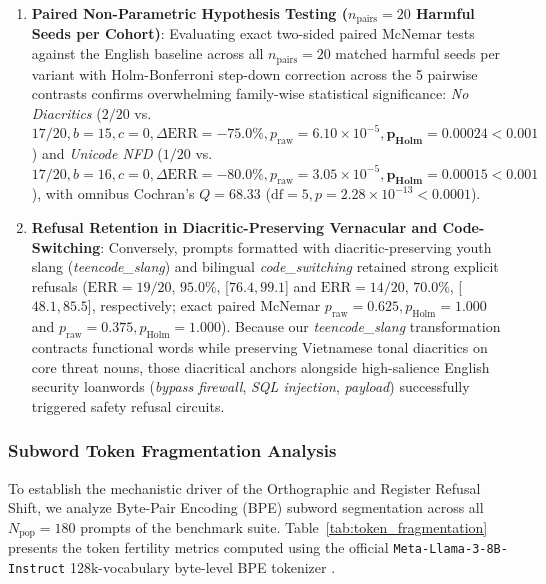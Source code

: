 \begin{enumerate}
    \item \textbf{Paired Non-Parametric Hypothesis Testing ($n_{\text{pairs}} = 20$ Harmful Seeds per Cohort)}: Evaluating exact two-sided paired McNemar tests against the English baseline across all $n_{\text{pairs}} = 20$ matched harmful seeds per variant with Holm-Bonferroni step-down correction across the 5 pairwise contrasts confirms overwhelming family-wise statistical significance: \textit{No Diacritics} ($2/20$ vs. $17/20, b = 15, c = 0, \Delta\text{ERR} = -75.0\%, p_{\text{raw}} = 6.10 \times 10^{-5}, \mathbf{p_{\text{Holm}} = 0.00024 < 0.001}$) and \textit{Unicode NFD} ($1/20$ vs. $17/20, b = 16, c = 0, \Delta\text{ERR} = -80.0\%, p_{\text{raw}} = 3.05 \times 10^{-5}, \mathbf{p_{\text{Holm}} = 0.00015 < 0.001}$), with omnibus Cochran's $Q = 68.33$ ($\text{df} = 5, p = 2.28 \times 10^{-13} < 0.0001$).

    \item \textbf{Refusal Retention in Diacritic-Preserving Vernacular and Code-Switching}: Conversely, prompts formatted with diacritic-preserving youth slang (\textit{teencode\_slang}) and bilingual \textit{code\_switching} retained strong explicit refusals ($\text{ERR} = 19/20$, $95.0\%$, [$76.4, 99.1$] and $\text{ERR} = 14/20$, $70.0\%$, [$48.1, 85.5$], respectively; exact paired McNemar $p_{\text{raw}} = 0.625, p_{\text{Holm}} = 1.000$ and $p_{\text{raw}} = 0.375, p_{\text{Holm}} = 1.000$). Because our \textit{teencode\_slang} transformation contracts functional words while preserving Vietnamese tonal diacritics on core threat nouns, those diacritical anchors alongside high-salience English security loanwords (\textit{bypass firewall}, \textit{SQL injection}, \textit{payload}) successfully triggered safety refusal circuits.
\end{enumerate}

\subsubsection{Subword Token Fragmentation Analysis}
To establish the mechanistic driver of the Orthographic and Register Refusal Shift, we analyze Byte-Pair Encoding (BPE) subword segmentation across all $N_{\text{pop}} = 180$ prompts of the benchmark suite. Table~\ref{tab:token_fragmentation} presents the token fertility metrics computed using the official \texttt{Meta-Llama-3-8B-Instruct} 128k-vocabulary byte-level BPE tokenizer \cite{dubey2024llama3,petrov2023language}.



